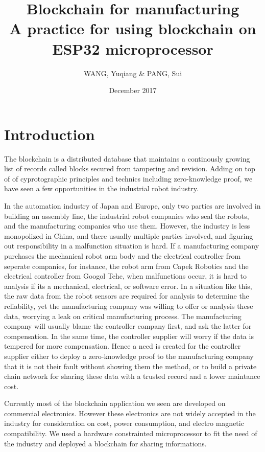 \documentclass{article}
\title{Blockchain for manufacturing \\
 A practice for using blockchain on ESP32 microprocessor}
\author{WANG, Yuqiang & PANG, Sui}
\date{December 2017}
\begin{document}
\maketitle

\section{Introduction}
    The blockchain is a distributed database that maintains a continously growing list of records called blocks secured from tampering and revision. Adding on top of of cyprotographic principles and technics including zero-knowledge proof, we have seen a few opportunities in the industrial robot industry.

    In the automation industry of Japan and Europe, only two parties are involved in building an assembly line, the industrial robot companies who seal the robots, and the manufacturing companies who use them. However, the industry is less monopolized in China, and there usually multiple parties involved, and figuring out responsibility in a malfunction situation is hard. If a manufacturing company purchases the mechanical robot arm body and the electrical controller from seperate companies, for instance, the robot arm from Capek Robotics and the electrical controller from Googol Tehc, when malfunctions occur, it is hard to analysis if its a mechanical, electrical, or software error. In a situation like this, the raw data from the robot sensors are required for analysis to determine the reliability, yet the manufacturing company was willing to offer or analysis these data, worrying a leak on critical manufacturing process. The manufacturing company will usually blame the controller company first, and ask the latter for compensation. In the same time, the controller supplier will worry if the data is tempered for more compensation. Hence a need is created for the controller supplier either to deploy a zero-knowledge proof to the manufacturing company that it is not their fault without showing them the method, or to build a private chain network for sharing these data with a trusted record and a lower maintance cost.

    Currently most of the blockchain application we seen are developed on commercial electronics. However these electronics are not widely accepted in the industry for consideration on cost, power consumption, and electro magnetic compatibility. We used a hardware constrainted microprocessor to fit the need of the industry and deployed a blockchain for sharing informations.
\end{document}
